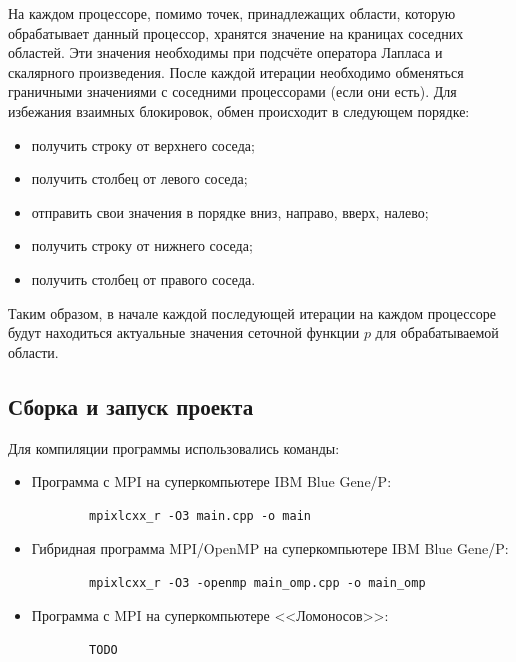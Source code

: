 \documentclass[11pt]{article}
\numberwithin{equation}{section}
\theoremstyle{plain}
\theoremstyle{definition}
\begin{document}
На каждом процессоре, помимо точек, принадлежащих области, которую обрабатывает
данный процессор, хранятся значение на краницах соседних областей. Эти
значения необходимы при подсчёте оператора Лапласа и скалярного произведения.
После каждой итерации необходимо обменяться граничными значениями с соседними
процессорами (если они есть). Для избежания взаимных блокировок, обмен
происходит в следующем порядке:
\begin{itemize}
    \item получить строку от верхнего соседа;
    \item получить столбец от левого соседа;
    \item отправить свои значения в порядке вниз, направо, вверх, налево;
    \item получить строку от нижнего соседа;
    \item получить столбец от правого соседа.
\end{itemize}

Таким образом, в начале каждой последующей итерации на каждом процессоре
будут находиться актуальные значения сеточной функции $p$ для обрабатываемой
области.

\subsection{Сборка и запуск проекта}

Для компиляции программы использовались команды:
\begin{itemize}
    \item Программа с MPI на суперкомпьютере IBM Blue Gene/P:
        \begin{verbatim}
        mpixlcxx_r -O3 main.cpp -o main
        \end{verbatim}
    \item Гибридная программа MPI/OpenMP на суперкомпьютере IBM Blue Gene/P:
        \begin{verbatim}
        mpixlcxx_r -O3 -openmp main_omp.cpp -o main_omp
        \end{verbatim}
    \item Программа с MPI на суперкомпьютере <<Ломоносов>>:
        \begin{verbatim}
        TODO
        \end{verbatim}
\end{itemize}
\end{document}
